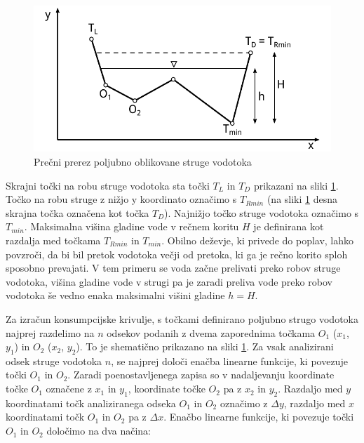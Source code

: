 \begin{figure}[ht!]
	\begin{centering}
		\includegraphics{slike/customChannel/customStruga.pdf}\caption{Prečni prerez poljubno oblikovane struge vodotoka}\label{fig:poljubnaStruga}
	\end{centering}
\end{figure}



Skrajni točki na robu struge vodotoka sta točki $T_L$ in $T_D$ prikazani na sliki \ref{fig:poljubnaStruga}. Točko na robu struge z nižjo y koordinato označimo s $T_{Rmin}$ (na sliki \ref{fig:poljubnaStruga} desna skrajna točka označena kot točka $T_D$). Najnižjo točko struge vodotoka označimo s $T_{min}$. Maksimalna višina gladine vode v rečnem koritu $H$ je definirana kot razdalja med točkama $T_{Rmin}$ in $T_{min}$. Obilno deževje, ki privede do poplav, lahko povzroči, da bi bil pretok vodotoka večji od pretoka, ki ga je rečno korito sploh sposobno prevajati. V tem primeru se voda začne prelivati preko robov struge vodotoka, višina gladine vode v strugi pa je zaradi preliva vode preko robov vodotoka še vedno enaka maksimalni višini gladine $h=H$.



Za izračun konsumpcijske krivulje, s točkami definirano poljubno strugo vodotoka najprej razdelimo na $n$ odsekov podanih z dvema zaporednima točkama $O_1$ ($x_1$, $y_1$) in $O_2$ ($x_2$, $y_2$). To je shematično prikazano na sliki \ref{fig:poljubnaStruga}. Za vsak analizirani odsek struge vodotoka $n$, se najprej določi enačba linearne funkcije, ki povezuje točki $O_1$ in $O_2$.  Zaradi poenostavljenega zapisa so v nadaljevanju koordinate točke $O_1$ označene z $x_1$ in $y_1$, koordinate točke $O_2$ pa z $x_2$ in $y_2$. Razdaljo med $y$ koordinatami točk analiziranega odseka $O_1$ in $O_2$ označimo z $\Delta y$, razdaljo med $x$ koordinatami točk $O_1$ in $O_2$ pa z $\Delta x$. Enačbo linearne funkcije, ki povezuje točki $O_1$ in $O_2$ določimo na dva načina:

